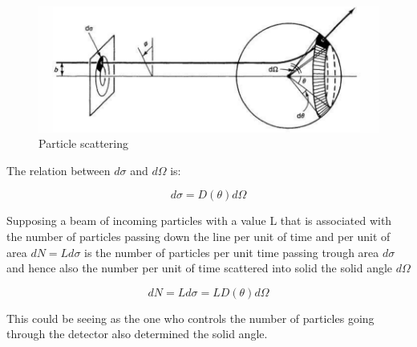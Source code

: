 \begin{figure}[h]
    \centering
   \includegraphics[width=1\textwidth]{cross1.png}
    \caption{Particle scattering}
    \label{fig:cross}
\end{figure}

The relation between $d\sigma$ and $d\Omega$ is:

\begin{equation}
d\sigma = D(\theta)d\Omega
\end{equation}

Supposing a beam of incoming particles with a value L that is associated with the number of particles passing down the line per unit of time and per unit of area $dN = L d\sigma $ is the number of particles per unit time passing trough area $d\sigma$ and hence also the number per unit of time scattered into solid the solid angle $d\Omega$

\begin{equation}
dN = L d\sigma = LD(\theta) d\Omega 
\end{equation}

This could be seeing as the one who controls the number of particles going through the detector also determined the solid angle. 



